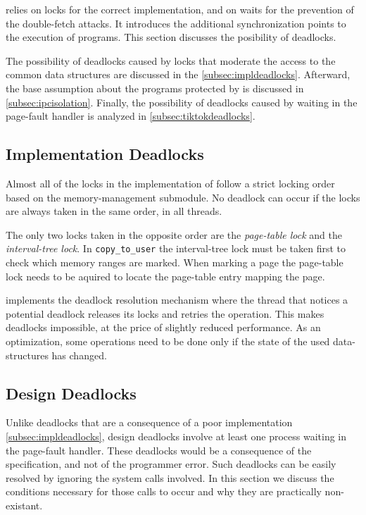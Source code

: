 \sysname relies on locks for the correct implementation, and on waits for the
prevention of the double-fetch attacks. It introduces the additional synchronization
points to the execution of programs. This section discusses the posibility of deadlocks.

The possibility of deadlocks caused by locks that moderate the access to the
common \sysname data structures are discussed in the
\autoref{subsec:impldeadlocks}. Afterward, the base assumption about the programs
protected by \sysname is discussed in \autoref{subsec:ipcisolation}. Finally,
the possibility of deadlocks caused by waiting in the page-fault handler is analyzed
in \autoref{subsec:tiktokdeadlocks}.

\subsection{Implementation Deadlocks}
\label{subsec:impldeadlocks}

Almost all of the locks in the implementation of \sysname follow a strict locking
order based on the memory-management submodule. No deadlock can occur if the locks
are always taken in the same order, in all threads.

The only two locks taken in the opposite order are the \emph{page-table lock}
and the \emph{interval-tree lock}. In \texttt{copy\_to\_user} the interval-tree
lock must be taken first to check which memory ranges are marked. When marking a
page the page-table lock needs to be aquired to locate the page-table entry
mapping the page.

\sysname implements the deadlock resolution mechanism where the thread that
notices a potential deadlock releases its locks and retries the operation. This
makes deadlocks impossible, at the price of slightly reduced performance. As an
optimization, some operations need to be done only if the state of the used
data-structures has changed.

\subsection{Design Deadlocks}
\label{subsec:tiktokdeadlocks}
Unlike deadlocks that are a consequence of a poor implementation
\autoref{subsec:impldeadlocks}, design deadlocks involve at least one process
waiting in the page-fault handler. These deadlocks would be a consequence of the
specification, and not of the programmer error. Such deadlocks can be easily
resolved by ignoring the system calls involved. In this section we discuss the 
conditions necessary for those calls to occur and why they are practically
non-existant.

